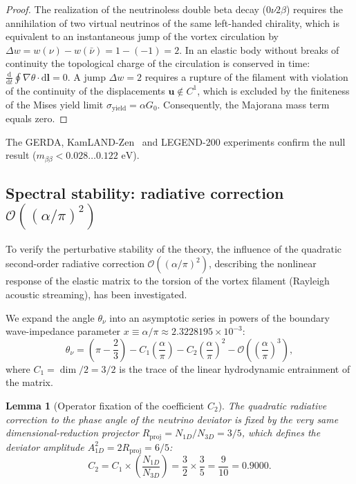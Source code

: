 \documentclass[11pt,a4paper]{article}
\newtheorem{lemma}[theorem]{Lemma}
\theoremstyle{definition}
\theoremstyle{remark}
\begin{document}
\begin{proof}
The realization of the neutrinoless double beta decay ($0\nu 2\beta$) requires the annihilation of two virtual neutrinos of the same left-handed chirality, which is equivalent to an instantaneous jump of the vortex circulation by $\Delta w = w(\nu) - w(\bar{\nu}) = 1 - (-1) = 2$. In an elastic body without breaks of continuity the topological charge of the circulation is conserved in time: $\frac{\mathrm{d}}{\mathrm{d}t} \oint \nabla\theta \cdot \mathrm{d}\mathbf{l} = 0$. A jump $\Delta w = 2$ requires a rupture of the filament with violation of the continuity of the displacements $\mathbf{u} \notin C^1$, which is excluded by the finiteness of the Mises yield limit $\sigma_{\mathrm{yield}} = \alpha G_0$. Consequently, the Majorana mass term equals zero.
\end{proof}
The GERDA, KamLAND-Zen~\cite{KamLANDZen2025} and LEGEND-200 experiments confirm the null result ($m_{\beta\beta} < 0.028\dots 0.122\text{ eV}$).
	
\subsection{Spectral stability: radiative correction $\mathcal{O}((\alpha/\pi)^2)$}
	
To verify the perturbative stability of the theory, the influence of the quadratic second-order radiative correction $\mathcal{O}((\alpha/\pi)^2)$, describing the nonlinear response of the elastic matrix to the torsion of the vortex filament (Rayleigh acoustic streaming), has been investigated.
	
We expand the angle $\theta_\nu$ into an asymptotic series in powers of the boundary wave-impedance parameter $x \equiv \alpha/\pi \approx 2.3228195 \times 10^{-3}$:
\begin{equation}
\theta_\nu = \left(\pi - \frac{2}{3}\right) - C_1 \left(\frac{\alpha}{\pi}\right) - C_2 \left(\frac{\alpha}{\pi}\right)^2 - \mathcal{O}\left(\left(\frac{\alpha}{\pi}\right)^3\right),
\label{eq:theta_nu_expansion_chapter}
\end{equation}
where $C_1 = \dim/2 = 3/2$ is the trace of the linear hydrodynamic entrainment of the matrix. 
	
\begin{lemma}[Operator fixation of the coefficient $C_2$]
\label{lem:neutrino_c2_operator}
The quadratic radiative correction to the phase angle of the neutrino deviator is fixed by the very same dimensional-reduction projector $R_{\mathrm{proj}} = N_{1D}/N_{3D} = 3/5$, which defines the deviator amplitude $A_{1D}^2 = 2 R_{\mathrm{proj}} = 6/5$:
\begin{equation}
C_2 = C_1 \times \left(\frac{N_{1D}}{N_{3D}}\right) = \frac{3}{2} \times \frac{3}{5} = \frac{9}{10} = 0.9000.
\label{eq:C2_operator_exact}
\end{equation}
\end{lemma}
	
\end{document}
